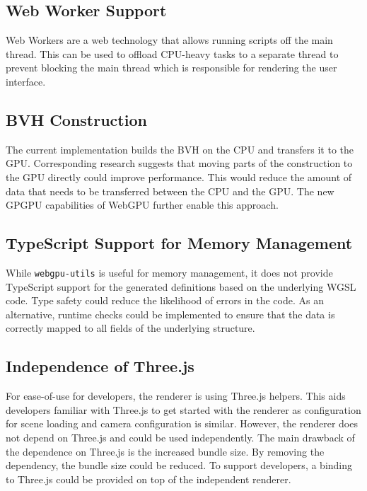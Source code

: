 
\subsection*{Web Worker Support}

Web Workers are a web technology that allows running scripts off the main thread. This can be used to offload \gls{CPU}-heavy tasks to a separate thread to prevent blocking the main thread which is responsible for rendering the user interface.

\subsection*{BVH Construction}

The current implementation builds the \gls{BVH} on the \gls{CPU} and transfers it to the \gls{GPU}. Corresponding research \cite{lauterbach2009GPUbvh} suggests that moving parts of the construction to the \gls{GPU} directly could improve performance. This would reduce the amount of data that needs to be transferred between the \gls{CPU} and the \gls{GPU}. The new \gls{GPGPU} capabilities of WebGPU further enable this approach.

\subsection*{TypeScript Support for Memory Management}

While \texttt{webgpu-utils} \cite{webgpuUtilsLib} is useful for memory management, it does not provide TypeScript support for the generated definitions based on the underlying \gls{WGSL} code. Type safety could reduce the likelihood of errors in the code. As an alternative, runtime checks could be implemented to ensure that the data is correctly mapped to all fields of the underlying structure.

\subsection*{Independence of Three.js}

For ease-of-use for developers, the renderer is using \gls{Three.js} helpers. This aids developers familiar with \gls{Three.js} to get started with the renderer as configuration for scene loading and camera configuration is similar. However, the renderer does not depend on \gls{Three.js} and could be used independently. The main drawback of the dependence on \gls{Three.js} is the increased bundle size. By removing the dependency, the bundle size could be reduced. To support developers, a binding to \gls{Three.js} could be provided on top of the independent renderer.

